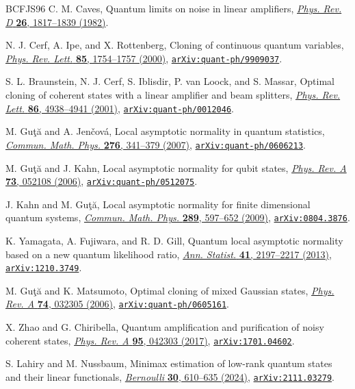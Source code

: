 \documentclass[11pt]{article}
\theoremstyle{remark}
\theoremstyle{plain}
\newcommand{\doi}[2]{\href{https://doi.org/#1}{#2}}
\newcommand{\arxiv}[1]{\href{https://arxiv.org/abs/#1}{\texttt{arXiv:#1}}}
\begin{document}
\begin{thebibliography}{BCFJS96}
C. M. Caves,
Quantum limits on noise in linear amplifiers,
\doi{10.1103/PhysRevD.26.1817}{\emph{Phys. Rev. D} \textbf{26}, 1817--1839 (1982)}.

N. J. Cerf, A. Ipe, and X. Rottenberg,
Cloning of continuous quantum variables,
\doi{10.1103/PhysRevLett.85.1754}{\emph{Phys. Rev. Lett.} \textbf{85}, 1754--1757 (2000)},
\arxiv{quant-ph/9909037}.

S. L. Braunstein, N. J. Cerf, S. Iblisdir, P. van Loock, and S. Massar,
Optimal cloning of coherent states with a linear amplifier and beam splitters,
\doi{10.1103/PhysRevLett.86.4938}{\emph{Phys. Rev. Lett.} \textbf{86}, 4938--4941 (2001)},
\arxiv{quant-ph/0012046}.

M. Gu{\c t}{\u a} and A. Jen{\v c}ov\'a,
Local asymptotic normality in quantum statistics,
\doi{10.1007/s00220-007-0340-1}{\emph{Commun. Math. Phys.} \textbf{276}, 341--379 (2007)},
\arxiv{quant-ph/0606213}.

M. Gu{\c t}{\u a} and J. Kahn,
Local asymptotic normality for qubit states,
\doi{10.1103/PhysRevA.73.052108}{\emph{Phys. Rev. A} \textbf{73}, 052108 (2006)},
\arxiv{quant-ph/0512075}.

J. Kahn and M. Gu{\c t}{\u a},
Local asymptotic normality for finite dimensional quantum systems,
\doi{10.1007/s00220-009-0787-3}{\emph{Commun. Math. Phys.} \textbf{289}, 597--652 (2009)},
\arxiv{0804.3876}.

K. Yamagata, A. Fujiwara, and R. D. Gill,
Quantum local asymptotic normality based on a new quantum likelihood ratio,
\doi{10.1214/13-AOS1147}{\emph{Ann. Statist.} \textbf{41}, 2197--2217 (2013)},
\arxiv{1210.3749}.

M. Gu{\c t}{\u a} and K. Matsumoto,
Optimal cloning of mixed Gaussian states,
\doi{10.1103/PhysRevA.74.032305}{\emph{Phys. Rev. A} \textbf{74}, 032305 (2006)},
\arxiv{quant-ph/0605161}.

X. Zhao and G. Chiribella,
Quantum amplification and purification of noisy coherent states,
\doi{10.1103/PhysRevA.95.042303}{\emph{Phys. Rev. A} \textbf{95}, 042303 (2017)},
\arxiv{1701.04602}.

S. Lahiry and M. Nussbaum,
Minimax estimation of low-rank quantum states and their linear functionals,
\doi{10.3150/23-BEJ1610}{\emph{Bernoulli} \textbf{30}, 610--635 (2024)},
\arxiv{2111.03279}.


\end{thebibliography}
\end{document}
